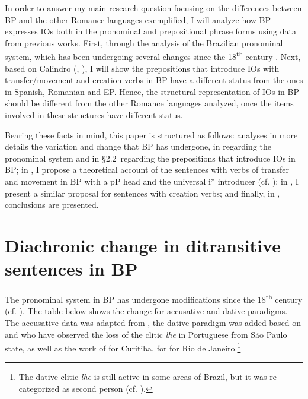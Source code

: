 \documentclass[output=paper,colorlinks,citecolor=brown]{./langscibook}
\begin{document}
In order to answer my main research question focusing on the differences between BP and the other Romance languages exemplified, I will analyze how BP expresses IOs both in the pronominal and prepositional phrase forms using data from previous works. First, through the analysis of the Brazilian pronominal system, which has been undergoing several changes since the 18\textsuperscript{th} century \citep{KatoCyrinoCorrêa2009}. Next, based on Calindro (\citeyear{Calindro2015}, \citeyear{Calindro2016}), I will show the prepositions that introduce IOs with transfer/movement and creation verbs in BP have a different status from the ones in Spanish, Romanian and EP. Hence, the structural representation of IOs in BP should be different from the other Romance languages analyzed, once the items involved in these structures have different status.

Bearing these facts in mind, this paper is structured as follows:  analyses in more details the variation and change that BP has undergone, in  regarding the pronominal system and in §2.2~regarding the prepositions that introduce IOs in BP; in , I propose a theoretical account of the sentences with verbs of transfer and movement in BP with a pP head and the universal i* introducer (cf. \citealt{Wood2012, WoodMarantz2017}); in , I present a similar proposal for sentences with creation verbs; and finally, in , conclusions are presented.

\section{Diachronic change in ditransitive sentences in BP}\label{sec:calindro:2}

The pronominal system in BP has undergone modifications since the 18\textsuperscript{th} century (cf. \citealt{KatoCyrinoCorrêa2009}). The table below shows the change for accusative and dative paradigms. The accusative data was adapted from \citet[246]{KatoCyrinoCorrêa2009}, the dative paradigm was added based on \citet{Calindro2015} and \citet{TorresMoraisBerlinck2006} who have observed the loss of the clitic \textit{lhe} in Portuguese from São Paulo state, as well as the work of \citet{Berlinck1997} for Curitiba, \citet{Silveira1999} for \citet{Freire2005} for Rio de Janeiro.\footnote{The dative clitic \textit{lhe} is still active in some areas of Brazil, but it was re-categorized as second person (cf. \citealt{FigueiredoSilva2007}).}
\end{document}
